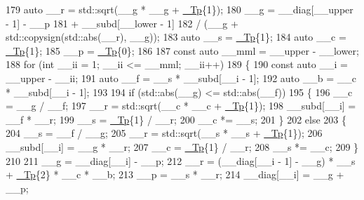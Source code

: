 \begin{DoxyCode}
179               \textcolor{keyword}{auto} \_\_r = std::sqrt(\_\_g * \_\_g + \hyperlink{namespace____gnu__cxx_a3b19a9c800ca194374ef9172290f7d79}{\_Tp}\{1\});
180               \_\_g = \_\_diag[\_\_upper - 1] - \_\_p
181                   + \_\_subd[\_\_lower - 1]
182                         / (\_\_g + std::copysign(std::abs(\_\_r), \_\_g));
183               \textcolor{keyword}{auto} \_\_s = \hyperlink{namespace____gnu__cxx_a3b19a9c800ca194374ef9172290f7d79}{\_Tp}\{1\};
184               \textcolor{keyword}{auto} \_\_c = \hyperlink{namespace____gnu__cxx_a3b19a9c800ca194374ef9172290f7d79}{\_Tp}\{1\};
185               \_\_p = \hyperlink{namespace____gnu__cxx_a3b19a9c800ca194374ef9172290f7d79}{\_Tp}\{0\};
186 
187               \textcolor{keyword}{const} \textcolor{keyword}{auto} \_\_mml = \_\_upper - \_\_lower;
188               \textcolor{keywordflow}{for} (\textcolor{keywordtype}{int} \_\_ii = 1; \_\_ii <= \_\_mml; \_\_ii++)
189                 \{
190                   \textcolor{keyword}{const} \textcolor{keyword}{auto} \_\_i = \_\_upper - \_\_ii;
191                   \textcolor{keyword}{auto} \_\_f = \_\_s * \_\_subd[\_\_i - 1];
192                   \textcolor{keyword}{auto} \_\_b = \_\_c * \_\_subd[\_\_i - 1];
193 
194                   \textcolor{keywordflow}{if} (std::abs(\_\_g) <= std::abs(\_\_f))
195                     \{
196                       \_\_c = \_\_g / \_\_f;
197                       \_\_r =  std::sqrt(\_\_c * \_\_c + \hyperlink{namespace____gnu__cxx_a3b19a9c800ca194374ef9172290f7d79}{\_Tp}\{1\});
198                       \_\_subd[\_\_i] = \_\_f * \_\_r;
199                       \_\_s = \hyperlink{namespace____gnu__cxx_a3b19a9c800ca194374ef9172290f7d79}{\_Tp}\{1\} / \_\_r;
200                       \_\_c *= \_\_s;
201                     \}
202                   \textcolor{keywordflow}{else}
203                     \{
204                       \_\_s = \_\_f / \_\_g;
205                       \_\_r =  std::sqrt(\_\_s * \_\_s + \hyperlink{namespace____gnu__cxx_a3b19a9c800ca194374ef9172290f7d79}{\_Tp}\{1\});
206                       \_\_subd[\_\_i] = \_\_g * \_\_r;
207                       \_\_c = \hyperlink{namespace____gnu__cxx_a3b19a9c800ca194374ef9172290f7d79}{\_Tp}\{1\} / \_\_r;
208                       \_\_s *= \_\_c;
209                     \}
210 
211                   \_\_g = \_\_diag[\_\_i] - \_\_p;
212                   \_\_r = (\_\_diag[\_\_i - 1] - \_\_g) * \_\_s + \hyperlink{namespace____gnu__cxx_a3b19a9c800ca194374ef9172290f7d79}{\_Tp}\{2\} * \_\_c * \_\_b;
213                   \_\_p = \_\_s * \_\_r;
214                   \_\_diag[\_\_i] = \_\_g + \_\_p;

\end{DoxyCode}
